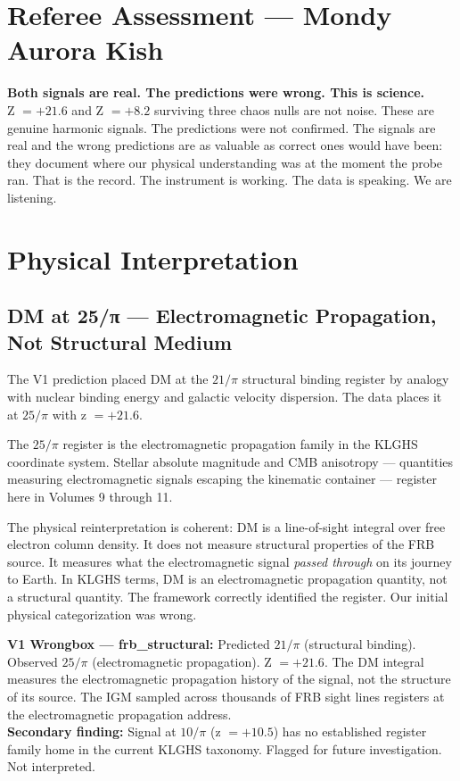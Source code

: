 \documentclass[11pt, letterpaper, openany]{book}
\begin{document}
\section*{Referee Assessment --- Mondy Aurora Kish}

\begin{warningbox}
\textbf{Both signals are real. The predictions were wrong. This is science.}\\[0.5em]
Z $= +21.6$ and Z $= +8.2$ surviving three chaos nulls are not noise.
These are genuine harmonic signals. The predictions were not confirmed.
The signals are real and the wrong predictions are as valuable as correct
ones would have been: they document where our physical understanding
was at the moment the probe ran. That is the record. The instrument
is working. The data is speaking. We are listening.
\end{warningbox}

\section*{Physical Interpretation}

\subsection*{DM at 25/π --- Electromagnetic Propagation, Not Structural Medium}

The V1 prediction placed DM at the $21/\pi$ structural binding register by analogy
with nuclear binding energy and galactic velocity dispersion. The data places it
at $25/\pi$ with z $= +21.6$.

The $25/\pi$ register is the electromagnetic propagation family in the KLGHS
coordinate system. Stellar absolute magnitude and CMB anisotropy --- quantities
measuring electromagnetic signals escaping the kinematic container --- register
here in Volumes 9 through 11.

The physical reinterpretation is coherent: DM is a line-of-sight integral over
free electron column density. It does not measure structural properties of the
FRB source. It measures what the electromagnetic signal \emph{passed through}
on its journey to Earth. In KLGHS terms, DM is an electromagnetic propagation
quantity, not a structural quantity. The framework correctly identified the register.
Our initial physical categorization was wrong.

\begin{warningbox}
\textbf{V1 Wrongbox --- frb\_structural:}
Predicted $21/\pi$ (structural binding). Observed $25/\pi$ (electromagnetic
propagation). Z $= +21.6$. The DM integral measures the electromagnetic
propagation history of the signal, not the structure of its source.
The IGM sampled across thousands of FRB sight lines registers at the
electromagnetic propagation address.\\[0.5em]
\textbf{Secondary finding:} Signal at $10/\pi$ (z $= +10.5$) has no
established register family home in the current KLGHS taxonomy.
Flagged for future investigation. Not interpreted.
\end{warningbox}
\end{document}

